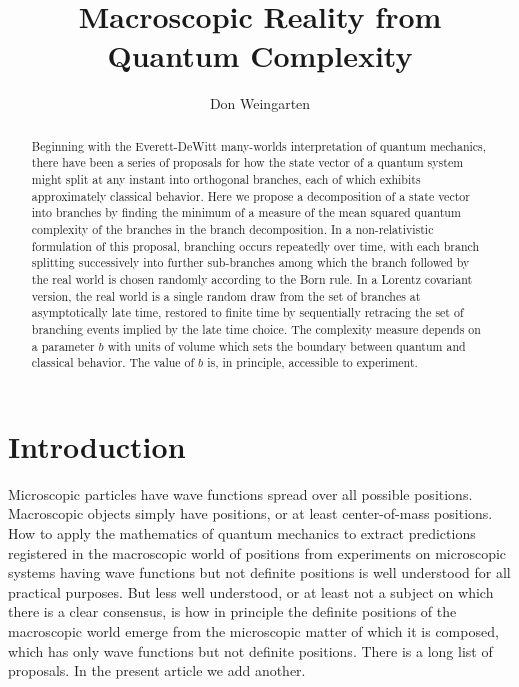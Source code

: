 \documentclass[12pt,amsmath,amssymb,onecolumn]{revtex4-2}
\begin{document}
\title{Macroscopic Reality from Quantum Complexity}
\author{Don Weingarten}

\begin{abstract}
Beginning with the Everett-DeWitt many-worlds interpretation of quantum mechanics, there have
been a series of proposals for how the state vector of a quantum system might split at any instant
into orthogonal branches, each of which exhibits approximately classical behavior.
Here we propose a decomposition of a state vector into branches 
by finding the minimum of a measure of the mean squared quantum complexity of the branches in the branch 
decomposition. 
In a non-relativistic formulation of this proposal, branching occurs repeatedly over time,
with each branch splitting successively into further sub-branches among which
the branch followed by the real world is chosen randomly according to the Born rule.
In a Lorentz covariant version,
the real world is a single random draw from 
the set of branches at asymptotically late time,
restored to finite time
by sequentially retracing the set of branching 
events implied by the late time choice.
The complexity measure depends on a parameter $b$ with units of volume which
sets the boundary between quantum and classical behavior. 
The value of $b$ is, in principle, accessible to experiment.
\end{abstract}

\maketitle
\newpage

\section{\label{sec:intro}Introduction}

Microscopic particles have wave functions spread over all possible positions. 
Macroscopic objects simply have positions, or at least center-of-mass positions.
How to apply the mathematics of quantum mechanics to extract predictions 
registered in the macroscopic world of positions 
from experiments on microscopic systems having wave functions but not definite positions 
is well understood for all practical purposes.
But less well understood, or at least not a subject on which there is a clear consensus, is 
how in principle the definite positions of the macroscopic world emerge from the microscopic 
matter of which it is composed, which has only wave functions but not definite positions.
There is a long list of proposals.
In the present article we add another.  
\end{document}
